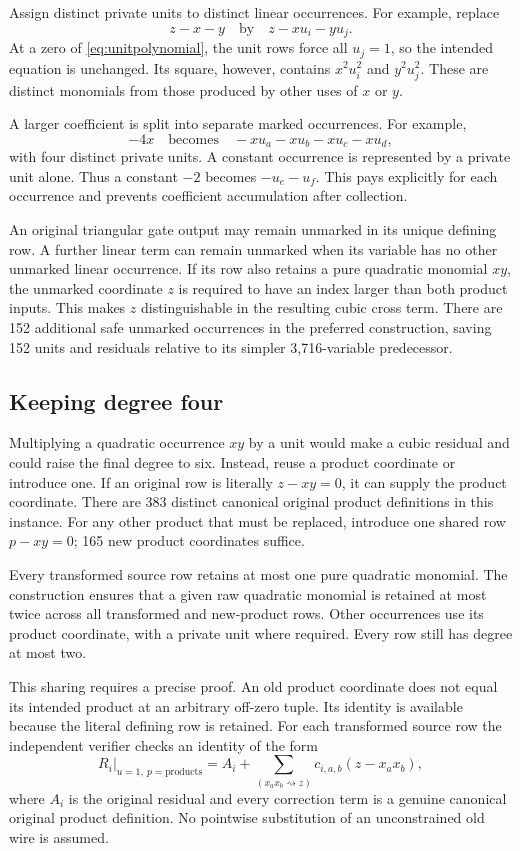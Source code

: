 Assign distinct private units to distinct linear occurrences. For example, replace
\[
z-x-y\quad\text{by}\quad z-xu_i-yu_j.
\]
At a zero of \eqref{eq:unitpolynomial}, the unit rows force all \(u_j=1\), so the intended equation is unchanged. Its square, however, contains \(x^2u_i^2\) and \(y^2u_j^2\). These are distinct monomials from those produced by other uses of \(x\) or \(y\).

A larger coefficient is split into separate marked occurrences. For example,
\[
-4x\quad\text{becomes}\quad-xu_a-xu_b-xu_c-xu_d,
\]
with four distinct private units. A constant occurrence is represented by a private unit alone. Thus a constant \(-2\) becomes \(-u_e-u_f\). This pays explicitly for each occurrence and prevents coefficient accumulation after collection.

An original triangular gate output may remain unmarked in its unique defining row. A further linear term can remain unmarked when its variable has no other unmarked linear occurrence. If its row also retains a pure quadratic monomial \(xy\), the unmarked coordinate \(z\) is required to have an index larger than both product inputs. This makes \(z\) distinguishable in the resulting cubic cross term. There are 152 additional safe unmarked occurrences in the preferred construction, saving 152 units and residuals relative to its simpler 3,716-variable predecessor.

\subsection{Keeping degree four}

Multiplying a quadratic occurrence \(xy\) by a unit would make a cubic residual and could raise the final degree to six. Instead, reuse a product coordinate or introduce one. If an original row is literally \(z-xy=0\), it can supply the product coordinate. There are 383 distinct canonical original product definitions in this instance. For any other product that must be replaced, introduce one shared row \(p-xy=0\); 165 new product coordinates suffice.

Every transformed source row retains at most one pure quadratic monomial. The construction ensures that a given raw quadratic monomial is retained at most twice across all transformed and new-product rows. Other occurrences use its product coordinate, with a private unit where required. Every row still has degree at most two.

This sharing requires a precise proof. An old product coordinate does not equal its intended product at an arbitrary off-zero tuple. Its identity is available because the literal defining row is retained. For each transformed source row the independent verifier checks an identity of the form
\begin{equation}\label{eq:pullback}
R_i\big|_{u=1,\ p=\text{products}}
=A_i+\sum_{(x_ax_b\rightsquigarrow z)}c_{i,a,b}(z-x_ax_b),
\end{equation}
where \(A_i\) is the original residual and every correction term is a genuine canonical original product definition. No pointwise substitution of an unconstrained old wire is assumed.

